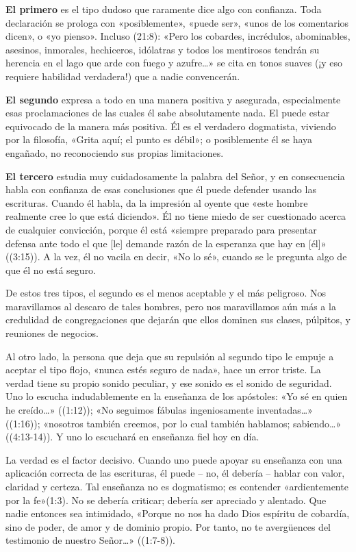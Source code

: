 \documentclass[12pt, twoside, openright]{book}
\begin{document}
\textbf{El primero} es el tipo dudoso que raramente dice algo con confianza. Toda declaración se prologa con «posiblemente», «puede ser», «unos de los comentarios dicen», o «yo pienso». Incluso (21:8): «Pero los cobardes, incrédulos, abominables, asesinos, inmorales, hechiceros, idólatras y todos los mentirosos tendrán su herencia en el lago que arde con fuego y azufre…» se cita en tonos suaves (¡y eso requiere habilidad verdadera!) que a nadie convencerán.

\textbf{El segundo} expresa a todo en una manera positiva y asegurada, especialmente esas proclamaciones de las cuales él sabe absolutamente nada. El puede estar equivocado de la manera más positiva. Él es el verdadero dogmatista, viviendo por la filosofía, «Grita aquí; el punto es débil»; o posiblemente él se haya engañado, no reconociendo sus propias limitaciones. 

\textbf{El tercero} estudia muy cuidadosamente la palabra del Señor, y en consecuencia habla con confianza de esas conclusiones que él puede defender usando las escrituras. Cuando él habla, da la impresión al oyente que «este hombre realmente cree lo que está diciendo». Él no tiene miedo de ser cuestionado acerca de cualquier convicción, porque él está «siempre preparado para presentar defensa ante todo el que [le] demande razón de la esperanza que hay en [él]» ((3:15)). A la vez, él no vacila en decir, «No lo sé», cuando se le pregunta algo de que él no está seguro. 

De estos tres tipos, el segundo es el menos aceptable y el más peligroso. Nos maravillamos al descaro de tales hombres, pero nos maravillamos aún más a la credulidad de congregaciones que dejarán que ellos dominen sus clases, púlpitos, y reuniones de negocios. 

Al otro lado, la persona que deja que su repulsión al segundo tipo le empuje a aceptar el tipo flojo, «nunca estés seguro de nada», hace un error triste. La verdad tiene su propio sonido peculiar, y ese sonido es el sonido de seguridad. Uno lo escucha indudablemente en la enseñanza de los apóstoles: «Yo sé en quien he creído…» ((1:12)); «No seguimos fábulas ingeniosamente inventadas…» ((1:16)); «nosotros también creemos, por lo cual también hablamos; sabiendo…» ((4:13-14)). Y uno lo escuchará en enseñanza fiel hoy en día. 

La verdad es el factor decisivo. Cuando uno puede apoyar su enseñanza con una aplicación correcta de las escrituras, él puede – no, él debería – hablar con valor, claridad y certeza. Tal enseñanza no es dogmatismo; es contender «ardientemente por la fe»(1:3). No se debería criticar; debería ser apreciado y alentado. Que nadie entonces sea intimidado, «Porque no nos ha dado Dios espíritu de cobardía, sino de poder, de amor y de dominio propio. Por tanto, no te avergüences del testimonio de nuestro Señor…» ((1:7-8)).
\end{document}
